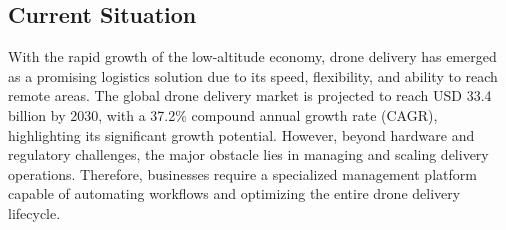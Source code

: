 \subsection{Current Situation}

With the rapid growth of the low-altitude economy, drone delivery has emerged as a promising logistics solution due to its speed, flexibility, and ability to reach remote areas. The global drone delivery market is projected to reach USD 33.4 billion by 2030, with a 37.2\% compound annual growth rate (CAGR), highlighting its significant growth potential. However, beyond hardware and regulatory challenges, the major obstacle lies in managing and scaling delivery operations. Therefore, businesses require a specialized management platform capable of automating workflows and optimizing the entire drone delivery lifecycle.
